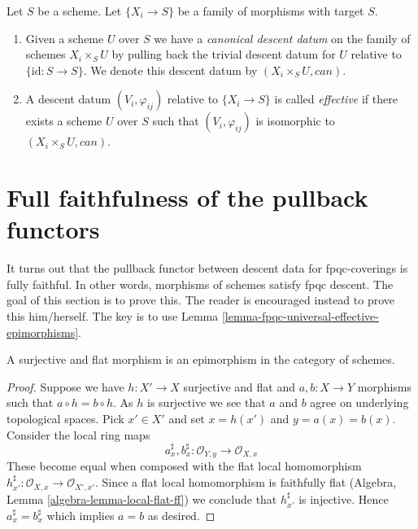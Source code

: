 \begin{definition}
\label{definition-effective-family}
Let $S$ be a scheme.
Let $\{X_i \to S\}$ be a family of morphisms
with target $S$.
\begin{enumerate}
\item  Given a scheme $U$ over $S$
we have a {\it canonical descent datum} on the family of
schemes $X_i \times_S U$ by pulling back the trivial
descent datum for $U$ relative to $\{\text{id} : S \to S\}$.
We denote this descent datum by $(X_i \times_S U, can)$.
\item A descent datum $(V_i, \varphi_{ij})$
relative to $\{X_i \to S\}$ is called {\it effective}
if there exists a scheme $U$ over $S$ such that
$(V_i, \varphi_{ij})$ is isomorphic to $(X_i \times_S U, can)$.
\end{enumerate}
\end{definition}












\section{Full faithfulness of the pullback functors}
\label{section-fully-faithful}

\noindent
It turns out that the pullback functor between descent data
for fpqc-coverings is fully faithful. In other words, morphisms of schemes
satisfy fpqc descent. The goal of this section
is to prove this. The reader is encouraged instead to prove this him/herself.
The key is to use Lemma \ref{lemma-fpqc-universal-effective-epimorphisms}.

\begin{lemma}
\label{lemma-surjective-flat-epi}
A surjective and flat morphism is an epimorphism in the
category of schemes.
\end{lemma}

\begin{proof}
Suppose we have $h : X' \to X$ surjective and flat and
$a, b : X \to Y$ morphisms such that $a \circ h = b \circ h$.
As $h$ is surjective we see that $a$ and $b$ agree on underlying
topological spaces. Pick $x' \in X'$ and set $x = h(x')$ and
$y = a(x) = b(x)$. Consider the local ring maps
$$
a^\sharp_x, b^\sharp_x : \mathcal{O}_{Y, y} \to \mathcal{O}_{X, x}
$$
These become equal when composed with
the flat local homomorphism
$h^\sharp_{x'} : \mathcal{O}_{X, x} \to \mathcal{O}_{X', x'}$.
Since a flat local homomorphism is faithfully flat
(Algebra, Lemma \ref{algebra-lemma-local-flat-ff})
we conclude that $h^\sharp_{x'}$ is injective.
Hence $a^\sharp_x = b^\sharp_x$ which implies $a = b$ as desired.
\end{proof}

